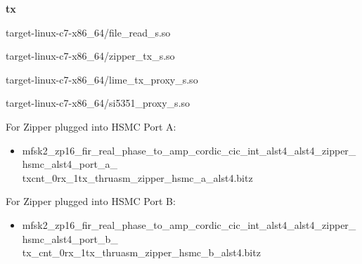 	\noindent\textbf{tx}
	\begin{itemize}
	\begin{minipage}[t]{.5\textwidth}
	\item target-linux-c7-x86\_64/file\_read\_s.so
	\item target-linux-c7-x86\_64/zipper\_tx\_s.so
	\end{minipage}
	\begin{minipage}[t]{.5\textwidth}
	\item target-linux-c7-x86\_64/lime\_tx\_proxy\_s.so
	\item target-linux-c7-x86\_64/si5351\_proxy\_s.so
	\end{minipage}
	\end{itemize}
	For Zipper plugged into HSMC Port A:
	\begin{itemize}
	\item mfsk2\_zp16\_fir\_real\_phase\_to\_amp\_cordic\_cic\_int\_alst4\_alst4\_zipper\_hsmc\_alst4\_port\_a\_\\
		txcnt\_0rx\_1tx\_thruasm\_zipper\_hsmc\_a\_alst4.bitz
	\end{itemize}
	For Zipper plugged into HSMC Port B:
	\begin{itemize}
	\item mfsk2\_zp16\_fir\_real\_phase\_to\_amp\_cordic\_cic\_int\_alst4\_alst4\_zipper\_hsmc\_alst4\_port\_b\_\\
		tx\_cnt\_0rx\_1tx\_thruasm\_zipper\_hsmc\_b\_alst4.bitz 
	\end{itemize}

